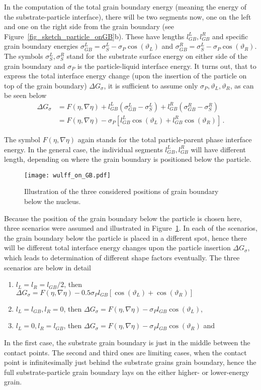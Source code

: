 In the computation of the total grain boundary energy (meaning the energy of the substrate-particle interface), there will be two segments now, one on the left and one on the right side from the grain boundary (see Figure~\ref{fig_sketch_particle_onGB}b). These have lengths $l_{GB}^{L}, l_{GB}^{R}$ and specific grain boundary energies $\sigma_{GB}^L=\sigma_{S}^L-\sigma_P\cos(\vartheta_L)$ and $\sigma_{GB}^R=\sigma_{S}^L-\sigma_P\cos(\vartheta_R)$. The symbols $\sigma_{S}^L,\sigma_{S}^R$ stand for the substrate surface energy on either side of the grain boundary and $\sigma_{P}$ is the particle-liquid interface energy. It turns out, that to express the total interface energy change (upon the insertion of the particle on top of the grain boundary) $\Delta G_\sigma$, it is sufficient to assume only $\sigma_P,\vartheta_L,\vartheta_R$, as can be seen below
\begin{align}
	\Delta G_\sigma &= F(\eta,\nabla\eta) + l_{GB}^{L}(\sigma_{GB}^L-\sigma_{S}^L) + l_{GB}^{R}(\sigma_{GB}^R-\sigma_{S}^R) \\
	&= F(\eta,\nabla\eta) - \sigma_P[l_{GB}^{L}\cos(\vartheta_L) + l_{GB}^{R}\cos(\vartheta_R)] \,.
\end{align}

The symbol $F(\eta,\nabla\eta)$ again stands for the total particle-parent phase interface energy. In the general case, the individual segments $l_{GB}^{L}, l_{GB}^{R}$ will have different length, depending on where the grain boundary is positioned below the particle. 

\begin{figure}
	\centering
	\texttt{[image: wulff\_on\_GB.pdf]}
	\caption{Illustration of the three considered positions of grain boundary below the nucleus.}
	\label{fig_GB_below_wulff}
\end{figure}

Because the position of the grain boundary below the particle is chosen here, three scenarios were assumed and illustrated in Figure~\ref{fig_GB_below_wulff}. In each of the scenarios, the grain boundary below the particle is placed in a different spot, hence there will be different total interface energy changes upon the particle insertion $\Delta G_\sigma$, which leads to determination of different shape factors eventually. The three scenarios are below in detail

\begin{enumerate}
	\item $l_L = l_R = l_{GB}/2$, then $\Delta G_\sigma = F(\eta,\nabla\eta)- 0.5\sigma_Pl_{GB}[\cos(\vartheta_L)+\cos(\vartheta_R)]$
	\item $l_L = l_{GB}, l_R = 0$, then $\Delta G_\sigma = F(\eta,\nabla\eta)- \sigma_Pl_{GB}\cos(\vartheta_L)$,
	\item $l_L = 0, l_R = l_{GB}$, then $\Delta G_\sigma = F(\eta,\nabla\eta)- \sigma_Pl_{GB}\cos(\vartheta_R)$ and
\end{enumerate}
In the first case, the substrate grain boundary is just in the middle between the contact points. The second and third ones are limiting cases, when the contact point is infinitesimally just behind the substrate grains grain boundary, hence the full substrate-particle grain boundary lays on the either higher- or lower-energy grain. 



